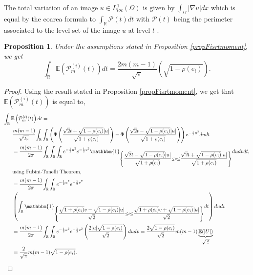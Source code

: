 \documentclass[12pt]{article}
\theoremstyle{Theorem}
\newtheorem{Proposition}[Theorem]{Proposition}
\begin{document}
The total variation of an image $u \in L^{1}_{loc}(\Omega)$ is given by $\int_{\Omega}|\nabla u|dx$ which is equal by the coarea formula to $\int_{\mathbb{R}}\mathcal{P}(t)dt$ with $\mathcal{P}(t)$ being the perimeter associated to the level set of the image $u$ at level $t$ .
\begin{Proposition}
Under the assumptions stated in Proposition \ref{propFisrtmoment}, we get 
\begin{equation}
\label{totalvariation}
\int_{\mathbb{R}} \mathbb{E}\left(\mathcal{P}^{(i)}_{m}(t)\right) dt = \frac{2m(m-1)}{\sqrt{\pi}}\left(\sqrt{1-\rho(e_i)}  \right).
\end{equation}
\end{Proposition}
\begin{proof}
Using the result stated in Proposition \ref{propFisrtmoment}, we get that $\mathbb{E}\left(\mathcal{P}^{\scriptscriptstyle  (i)}_{m}(t) \right)$ is equal to,
{\small
\begin{align*}
\int_{\mathbb{R}} \mathbb{E}\left(\mathcal{P}^{(i)}_{m}(t)\right) dt & = \\
& \hspace{-2cm}\cfrac{m(m-1)}{\sqrt{2\pi}} \int_{\mathbb{R}}\int_{\mathbb{R}} \left(\Phi\left(\dfrac{\sqrt{2}t + \sqrt{1-\rho(e_i)}|u|}{\sqrt{1+\rho(e_i)}}\right) - \Phi\left(\dfrac{\sqrt{2}t - \sqrt{1-\rho(e_i)}|u|}{\sqrt{1+\rho(e_i)}}\right)\right)e^{-\frac{1}{2}u^2}dudt \\
& \hspace{-2cm}=\cfrac{m(m-1)}{2\pi} \int_{\mathbb{R}}\int_{\mathbb{R}}\int_{\mathbb{R}} e^{-\frac{1}{2}u^2}e^{-\frac{1}{2}v^2} \mathbbm{1}_{\left\{\dfrac{\sqrt{2}t - \sqrt{1-\rho(e_i)}|u|}{\sqrt{1+\rho(e_i)}}\leq v \leq\dfrac{\sqrt{2}t + \sqrt{1-\rho(e_i)}|u|}{\sqrt{1+\rho(e_i)}}\right\}} du dv dt ,\\
& \hspace{-2cm}\text{using Fubini-Tonelli Theorem,} \\
& \hspace{-2cm}= \cfrac{m(m-1)}{2\pi}\int_{\mathbb{R}}\int_{\mathbb{R}} e^{-\frac{1}{2}u^2}e^{-\frac{1}{2}v^2} \\
& \hspace{-2cm} \left(\int_{\mathbb{R}} \mathbbm{1}_{\left\{\dfrac{\sqrt{1+\rho(e_i)}v - \sqrt{1-\rho(e_i)}|u|}{\sqrt{2}}\leq t\leq\dfrac{\sqrt{1+\rho(e_i)}v + \sqrt{1-\rho(e_i)}|u|}{\sqrt{2}}\right\}} dt\right) du dv \\
& \hspace{-2cm}= \cfrac{m(m-1)}{2\pi} \int_{\mathbb{R}}\int_{\mathbb{R}} e^{-\frac{1}{2}u^2}e^{-\frac{1}{2}v^2}\left(\dfrac{2|u|\sqrt{1-\rho(e_i)}}{\sqrt{2}}\right)dudv = \frac{2\sqrt{1-\rho(e_i)}}{\sqrt{2}} m(m-1)\underbrace{\mathbb{E}(|U|)}_{\sqrt{\frac{2}{\pi}}}\\
&\hspace{-2cm}=\frac{2}{\sqrt{\pi}}m(m-1)\sqrt{1-\rho(e_i)}.
\end{align*}
}
\end{proof}
\end{document}
